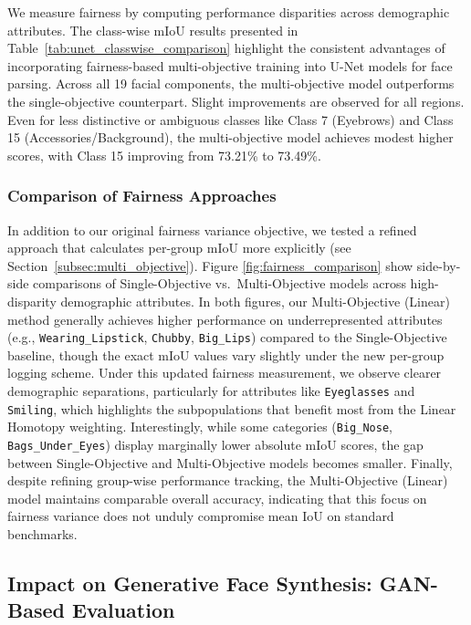 We measure fairness by computing performance disparities across demographic attributes. The class-wise mIoU results presented in Table~\ref{tab:unet_classwise_comparison} highlight the consistent advantages of incorporating fairness-based multi-objective training into U-Net models for face parsing. Across all 19 facial components, the multi-objective model outperforms the single-objective counterpart. Slight improvements are observed for all regions. Even for less distinctive or ambiguous classes like Class 7 (Eyebrows) and Class 15 (Accessories/Background), the multi-objective model achieves modest higher scores, with Class 15 improving from 73.21\% to 73.49\%.

\subsubsection{Comparison of Fairness Approaches}
\label{subsec:fairness_comparison}

In addition to our original fairness variance objective, we tested a refined approach that calculates per-group mIoU more explicitly (see Section~\ref{subsec:multi_objective}). Figure \ref{fig:fairness_comparison} show side-by-side comparisons of Single-Objective vs.\ Multi-Objective models across high-disparity demographic attributes. In both figures, our Multi-Objective (Linear) method generally achieves higher performance on underrepresented attributes (e.g., \texttt{Wearing\_Lipstick}, \texttt{Chubby}, \texttt{Big\_Lips}) compared to the Single-Objective baseline, though the exact mIoU values vary slightly under the new per-group logging scheme. Under this updated fairness measurement, we observe clearer demographic separations, particularly for attributes like \texttt{Eyeglasses} and \texttt{Smiling}, which highlights the subpopulations that benefit most from the Linear Homotopy weighting. Interestingly, while some categories (\texttt{Big\_Nose}, \texttt{Bags\_Under\_Eyes}) display marginally lower absolute mIoU scores, the gap between Single-Objective and Multi-Objective models becomes smaller. Finally, despite refining group-wise performance tracking, the Multi-Objective (Linear) model maintains comparable overall accuracy, indicating that this focus on fairness variance does not unduly compromise mean IoU on standard benchmarks.


\subsection{Impact on Generative Face Synthesis: GAN-Based Evaluation}
\label{subsec:gan_results}


